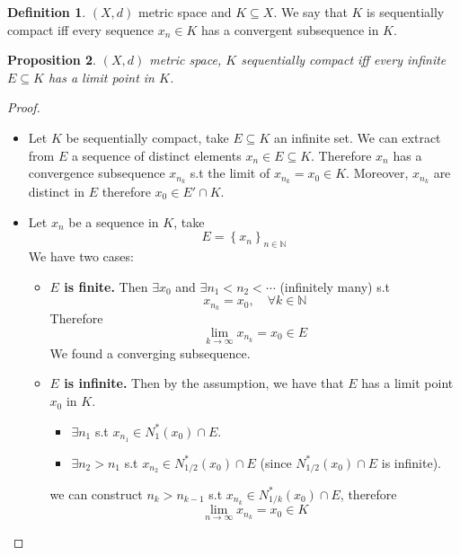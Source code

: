 \documentclass[11pt,a4paper]{article}
\theoremstyle{definition}
\newtheorem{definition}{Definition}[section]
\theoremstyle{plain}
\newtheorem{proposition}[definition]{Proposition}
\theoremstyle{remark}
\newcommand{\N}{\mathbb{N}}
\renewcommand{\set}[1]{\left\{ #1 \right\}}
\begin{document}
\begin{definition}
    $(X,d)$ metric space and $K \subseteq X$. We say that $K$ is sequentially compact iff every sequence $x_n \in K$ has a convergent subsequence in $K$. 
\end{definition}

\begin{proposition}
    $(X,d)$ metric space, $K$ sequentially compact iff every infinite $E \subseteq K$ has a limit point in $K$. 
\end{proposition}

\begin{proof}
    \begin{itemize}
        \item[$\implies$] Let $K$ be sequentially compact, take $E \subseteq K$ an infinite set. We can extract from $E$ a sequence of 
        distinct elements $x_n \in E \subseteq K$. Therefore $x_n$ has a convergence subsequence $x_{n_k}$ s.t the limit of $x_{n_k} = x_0 \in K$. 
        Moreover, $x_{n_k}$ are distinct in $E$ therefore $x_0 \in E' \cap K$.
        
        \item[$\impliedby$] Let $x_n$ be a sequence in $K$, take 
        $$E = \set{x_n}_{n \in \N}$$ 
        We have two cases: 
        \begin{itemize}
            \item \textbf{$E$ is finite.} Then $\exists x_0$ and $\exists n_1 < n_2 < \cdots$ (infinitely many) s.t 
            $$x_{n_k} = x_0, \quad \forall k \in \N$$
            Therefore 
            $$\lim_{k \to \infty} x_{n_k} = x_0 \in E$$
            We found a converging subsequence. 

            \item \textbf{$E$ is infinite.} Then by the assumption, we have that $E$ has a limit point $x_0$ in $K$. 
            \begin{itemize}
                \item[$\varepsilon = 1$] $\exists n_1$ s.t $x_{n_1} \in N_1^*(x_0) \cap E$. 
                \item[$\varepsilon = 1/2$] $\exists n_2 > n_1$ s.t $x_{n_2} \in N_{1/2}^*(x_0) \cap E$ (since $N_{1/2}^*(x_0) \cap E$ is infinite).  
            \end{itemize} 
            we can construct $n_k > n_{k-1}$ s.t $x_{n_k} \in N^*_{1/k} (x_0) \cap E$, therefore 
            $$\lim_{n \to \infty} x_{n_k} = x_0 \in K$$
        \end{itemize}
    \end{itemize}
\end{proof}
\end{document}
